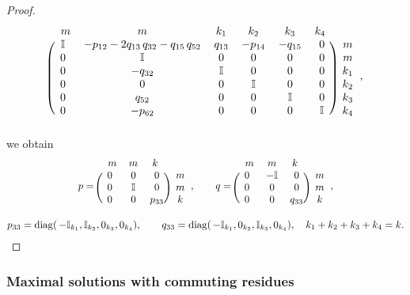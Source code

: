 \documentclass{article}
\theoremstyle{plain}
\DeclareMathOperator{\diag}{diag}
\begin{document}
\begin{proof}
$$\begin{blockarray}{ccccccc}
      \,\,\, m & m & k_1 & k_2 & k_3 & k_4 \,\,\, &  \\
    \begin{block}{(cccccc)c}
      \mathbb{I} & - p_{12} - 2 q_{13} \, q_{32} - q_{15} \, q_{52} & q_{13} & -p_{14} & -q_{15} & 0 & m  \\
      0 & \mathbb{I} & 0 & 0 & 0 & 0 & m  \\
      0 & - q_{32} & \mathbb{I} & 0 & 0 & 0 & k_1  \\
      0 & 0 & 0 & \mathbb{I} & 0 & 0 & k_2  \\
      0 & q_{52} & 0 & 0 & \mathbb{I} & 0 & k_3  \\
      0 & - p_{62} & 0 & 0 & 0 & \mathbb{I} & k_4  \\
    \end{block}
    \end{blockarray},
$$
we obtain 
\begin{gather}
    p
    =
    \begin{blockarray}{cccc}
      \,\,\, m & m & k \,\,\, &  \\
    \begin{block}{(ccc)c}
      0 & 0 & 0 & m  \\
      0 & \mathbb{I} & 0 & m  \\
      0 & 0 & p_{33} & k
      \\
    \end{block}
    \end{blockarray},
    \qquad
    q
    =
    \begin{blockarray}{cccc}
      \,\,\, m & m & k \,\,\, &  \\
    \begin{block}{(ccc)c}
      0 & - \mathbb{I} & 0 & m  \\
      0 & 0 & 0 & m  \\
      0 & 0 & q_{33} & k
      \\
    \end{block}
    \end{blockarray},
    \\
    \notag
    p_{33}
    = \diag (\,- \mathbb{I}_{k_1}, \mathbb{I}_{k_2}, 0_{k_3}, 0_{k_4}),
    \qquad 
    q_{33}
    = \diag (\,- \mathbb{I}_{k_1}, 0_{k_2}, \mathbb{I}_{k_3}, 0_{k_4}),
    \quad 
    k_1 + k_2 + k_3 + k_4 = k.
\end{gather}
\end{proof}

\subsubsection{Maximal solutions with commuting residues}\label{sec211}
\end{document}
